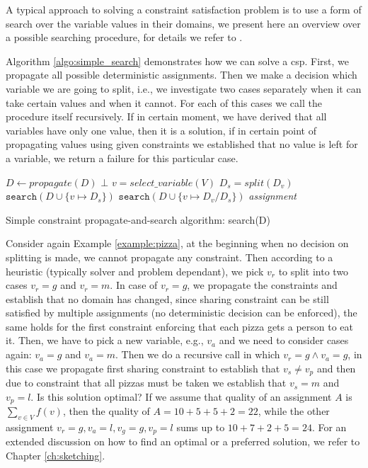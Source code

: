 A typical approach to solving a constraint satisfaction problem is to use a form of search over the variable values in their domains, we present here an overview over a possible searching procedure, for details we refer to \textcite{tias_phd}.

Algorithm \ref{algo:simple_search} demonstrates how we can solve a \acrshort{csp}. First, we propagate all possible deterministic assignments. Then we make a decision which variable we are going to split, i.e., we investigate two cases separately when it can take certain values and when it cannot. For each of this cases we call the procedure itself recursively. If in certain moment, we have derived that all variables have only one value, then it is a solution, if in certain point of propagating values using given constraints we established that no value is left for a variable, we return a failure for this particular case.

\begin{algorithm}[t]
    \begin{algorithmic}[1]
        \footnotesize
        \State $D \gets \textit{propagate}(D)$
        \State \Return $\bot$
        \EndIf
        \State $v = \textit{select\_variable}(V)$ 
        \State $D_s = \textit{split}(D_v)$  
        \State $\texttt{search}(D \cup \{ v \mapsto D_s \})$ 
        \State $\texttt{search}(D \cup \{ v \mapsto D_v / D_s \})$
        \Else
        \State \Return \textit{assignment}
        \EndIf
    \end{algorithmic}
    \caption{Simple constraint propagate-and-search algorithm: search(D)}
    \label{algo:simple_search}
\end{algorithm}

Consider again Example \ref{example:pizza}, at the beginning when no decision on splitting is made, we cannot propagate any constraint. Then according to a heuristic (typically solver and problem dependant), we pick $v_r$ to split into two cases $v_r = g$ and $v_r = m$. In case of $v_r = g$, we propagate the constraints and establish that no domain has changed, since sharing constraint can be still satisfied by multiple assignments (no deterministic decision can be enforced), the same holds for the first constraint enforcing that each pizza gets a person to eat it. Then, we have to pick a new variable, e.g., $v_a$ and we need to consider cases again: $v_a = g$ and $v_a=m$. Then we do a recursive call in which $v_r=g \wedge v_a=g$, in this case we propagate first sharing constraint to establish that $v_s \neq v_p$ and then due to constraint that all pizzas must be taken we establish that $v_s = m$ and $v_p = l$. Is this solution optimal? If we assume that quality of an assignment $A$ is $\sum_{v \in V} f(v)$, then the quality of $A = 10 + 5 + 5 +2 = 22$, while the other assignment  $v_r = g, v_a = l, v_g = g, v_p = l$ sums up to $10+7+2+5 = 24$. For an extended discussion on how to find an optimal or a preferred solution, we refer to Chapter \ref{ch:sketching}.

